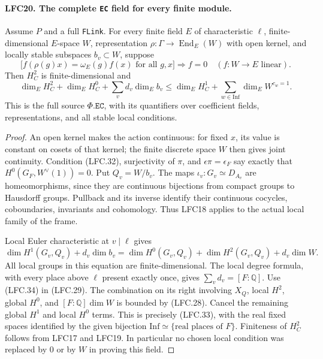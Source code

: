 \documentclass[11pt,a4paper]{article}
\numberwithin{equation}{section}
\theoremstyle{remark}\newtheorem{remark}[theorem]{Remark}
\begin{document}
\paragraph{LFC20. The complete \texttt{EC} field for every finite module.}
\label{claim:LFC20}
Assume \(P\) and a full \texttt{FLink}.
For every finite field \(E\) of characteristic \(\ell\),
finite-dimensional \(E\)-space \(W\), representation
\(\rho:\Gamma\to\operatorname{End}_E(W)\) with open kernel,
and locally stable subspaces \(b_v\subset W\), suppose
\[
 \bigl[f(\rho(g)x)=\omega_E(g)f(x)
           \text{ for all }g,x\bigr]\Longrightarrow f=0
                   \quad(f:W\to E\text{ linear}).        \tag{LFC.32}
\]
Then \(H^2_C\) is finite-dimensional and
\[
 \dim_E H^2_C+\dim_E H^0_C+\sum_v d_v\dim_E b_v
 \le \dim_E H^1_C+
                 \sum_{w\in\mathrm{Inf}}\dim_E W^{c_w=1}.
                                                        \tag{LFC.33}
\]
This is the full source \(\Phi.\texttt{EC}\), with its
quantifiers over coefficient fields, representations,
and all stable local conditions.

\begin{proof}
An open kernel makes the action continuous: for fixed
\(x\), its value is constant on cosets of that kernel;
the finite discrete space \(W\) then gives joint
continuity.  Condition (LFC.32), surjectivity of \(\pi\),
and \(\epsilon\pi=\epsilon_F\) say exactly that
\(H^0(G_F,W^\vee(1))=0\).
Put \(Q_v=W/b_v\).
The maps \(\iota_v:G_v\simeq D_{A_v}\) are homeomorphisms,
since they are continuous bijections from compact
groups to Hausdorff groups.  Pullback and its inverse
identify their continuous cocycles, coboundaries,
invariants and cohomology.  Thus LFC18 applies to
the actual local family of the frame.

Local Euler characteristic at \(v\mid\ell\) gives
\[
 \dim H^1(G_v,Q_v)+d_v\dim b_v
 =\dim H^0(G_v,Q_v)+\dim H^2(G_v,Q_v)+d_v\dim W.
                                                        \tag{LFC.34}
\]
All local groups in this equation are finite-dimensional.
The local degree formula, with every place above \(\ell\)
present exactly once, gives
\(\sum_v d_v=[F:\mathbb Q]\).
Use (LFC.34) in (LFC.29).
The combination on its right involving \(X_Q\), local
\(H^2\), global \(H^0\), and \([F:\mathbb Q]\dim W\)
is bounded by (LFC.28).
Cancel the remaining global \(H^1\) and local \(H^0\)
terms.  This is precisely (LFC.33), with the real
fixed spaces identified by the given bijection
\(\mathrm{Inf}\simeq\{\text{real places of }F\}\).
Finiteness of \(H^2_C\) follows from LFC17 and LFC19.
In particular no chosen local condition was replaced
by \(0\) or by \(W\) in proving this field.
\end{proof}
\end{document}
